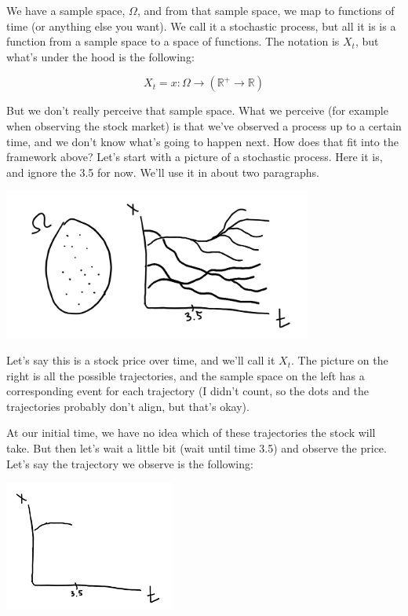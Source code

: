 \documentclass{article}
\begin{document}
We have a sample space, $\Omega$, and from that sample space, we map to functions of time (or anything else you want).  We call it a stochastic process, but all it is is a function from a sample space to a space of functions.  The notation is $X_t$, but what's under the hood is the following:

$$X_t = x : \Omega \rightarrow \left(\mathbb{R}^+ \rightarrow  \mathbb{R} \right)$$ 

But we don't really perceive that sample space.  What we perceive (for example when observing the stock market) is that we've observed a process up to a certain time, and we don't know what's going to happen next.  How does that fit into the framework above? Let's start with a picture of a stochastic process.  Here it is, and ignore the 3.5 for now. We'll use it in about two paragraphs.

\includegraphics[width=4in]{filtration_part_1.png}
\centering

Let's say this is a stock price over time, and we'll call it $X_t$.  The picture on the right is all the possible trajectories, and the sample space on the left has a corresponding event for each trajectory (I didn't count, so the dots and the trajectories probably don't align, but that's okay).

At our initial time, we have no idea which of these trajectories the stock will take.  But then let's wait a little bit (wait until time 3.5) and observe the price.  Let's say the trajectory we observe is the following:

\includegraphics[width=2.2in]{filtration_part_2.png}
\centering
\end{document}
